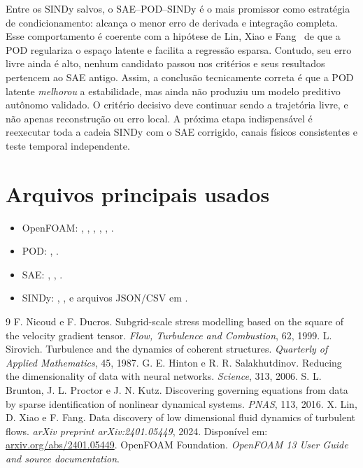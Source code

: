 \documentclass[12pt,a4paper]{article}
\begin{document}
Entre os SINDy salvos, o SAE--POD--SINDy é o mais promissor como estratégia de condicionamento: alcança o menor erro de derivada e integração completa. Esse comportamento é coerente com a hipótese de Lin, Xiao e Fang~\cite{lin2024} de que a POD regulariza o espaço latente e facilita a regressão esparsa. Contudo, seu erro livre ainda é alto, nenhum candidato passou nos critérios e seus resultados pertencem ao SAE antigo. Assim, a conclusão tecnicamente correta é que a POD latente \emph{melhorou} a estabilidade, mas ainda não produziu um modelo preditivo autônomo validado. O critério decisivo deve continuar sendo a trajetória livre, e não apenas reconstrução ou erro local. A próxima etapa indispensável é reexecutar toda a cadeia SINDy com o SAE corrigido, canais físicos consistentes e teste temporal independente.

\appendix
\section{Arquivos principais usados}
\small
\begin{itemize}
  \item OpenFOAM: , , , , , .
  \item POD: , .
  \item SAE: , , .
  \item SINDy: , ,  e arquivos JSON/CSV em .
\end{itemize}
\normalsize

\begin{thebibliography}{9}
 F. Nicoud e F. Ducros. Subgrid-scale stress modelling based on the square of the velocity gradient tensor. \emph{Flow, Turbulence and Combustion}, 62, 1999.
 L. Sirovich. Turbulence and the dynamics of coherent structures. \emph{Quarterly of Applied Mathematics}, 45, 1987.
 G. E. Hinton e R. R. Salakhutdinov. Reducing the dimensionality of data with neural networks. \emph{Science}, 313, 2006.
 S. L. Brunton, J. L. Proctor e J. N. Kutz. Discovering governing equations from data by sparse identification of nonlinear dynamical systems. \emph{PNAS}, 113, 2016.
 X. Lin, D. Xiao e F. Fang. Data discovery of low dimensional fluid dynamics of turbulent flows. \emph{arXiv preprint arXiv:2401.05449}, 2024. Disponível em: \href{https://arxiv.org/abs/2401.05449}{arxiv.org/abs/2401.05449}.
 OpenFOAM Foundation. \emph{OpenFOAM 13 User Guide and source documentation}.
\end{thebibliography}
\end{document}
